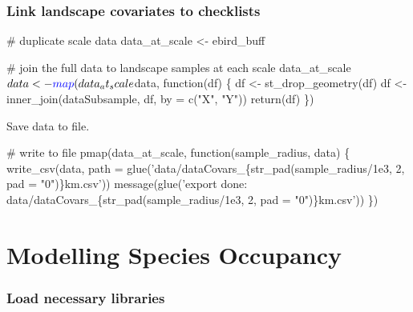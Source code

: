 \documentclass[]{article}
\newenvironment{Shaded}{}{}
\newcommand{\CommentTok}[1]{\textcolor[rgb]{0.00,0.50,0.00}{#1}}
\newcommand{\ControlFlowTok}[1]{\textcolor[rgb]{0.00,0.00,1.00}{#1}}
\newcommand{\DataTypeTok}[1]{#1}
\newcommand{\KeywordTok}[1]{\textcolor[rgb]{0.00,0.00,1.00}{#1}}
\newcommand{\NormalTok}[1]{#1}
\newcommand{\OperatorTok}[1]{#1}
\newcommand{\StringTok}[1]{\textcolor[rgb]{0.00,0.50,0.50}{#1}}
\begin{document}
\hypertarget{link-landscape-covariates-to-checklists}{%
\subsubsection{Link landscape covariates to checklists}\label{link-landscape-covariates-to-checklists}}

\begin{Shaded}
\begin{Highlighting}[]
\CommentTok{# duplicate scale data}
\NormalTok{data_at_scale <-}\StringTok{ }\NormalTok{ebird_buff}

\CommentTok{# join the full data to landscape samples at each scale}
\NormalTok{data_at_scale}\OperatorTok{$}\NormalTok{data <-}\StringTok{ }\KeywordTok{map}\NormalTok{(data_at_scale}\OperatorTok{$}\NormalTok{data, }\ControlFlowTok{function}\NormalTok{(df) \{}
\NormalTok{  df <-}\StringTok{ }\KeywordTok{st_drop_geometry}\NormalTok{(df)}
\NormalTok{  df <-}\StringTok{ }\KeywordTok{inner_join}\NormalTok{(dataSubsample, df, }\DataTypeTok{by =} \KeywordTok{c}\NormalTok{(}\StringTok{"X"}\NormalTok{, }\StringTok{"Y"}\NormalTok{))}
  \KeywordTok{return}\NormalTok{(df)}
\NormalTok{\})}
\end{Highlighting}
\end{Shaded}

Save data to file.

\begin{Shaded}
\begin{Highlighting}[]
\CommentTok{# write to file}
\KeywordTok{pmap}\NormalTok{(data_at_scale, }\ControlFlowTok{function}\NormalTok{(sample_radius, data) \{}
  \KeywordTok{write_csv}\NormalTok{(data, }\DataTypeTok{path =} \KeywordTok{glue}\NormalTok{(}\StringTok{'data/dataCovars_\{str_pad(sample_radius/1e3, 2, pad = "0")\}km.csv'}\NormalTok{))}
  \KeywordTok{message}\NormalTok{(}\KeywordTok{glue}\NormalTok{(}\StringTok{'export done: data/dataCovars_\{str_pad(sample_radius/1e3, 2, pad = "0")\}km.csv'}\NormalTok{))}
\NormalTok{\})}
\end{Highlighting}
\end{Shaded}

\hypertarget{modelling-species-occupancy}{%
\section{Modelling Species Occupancy}\label{modelling-species-occupancy}}

\hypertarget{load-necessary-libraries}{%
\subsubsection{Load necessary libraries}\label{load-necessary-libraries}}
\end{document}
